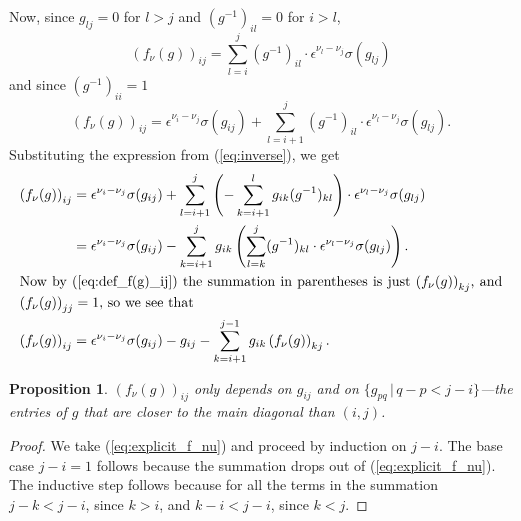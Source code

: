 \documentclass{amsart}
\newtheorem{prop}{Proposition}[subsection]
\theoremstyle{definition}
\def\e{\epsilon}
\def\s{\sigma}
\def\f{f_\nu}
\begin{document}
  Now, since $g_{lj} = 0$ for $l > j$ and $(g^{-1})_{il} = 0$ for $i > l$,
  \begin{equation}
    \label{eq:def_f(g)_ij}
    \left(\f(g)\right)_{ij} = \sum_{l=i}^j (g^{-1})_{il} \cdot \e^{\nu_l-\nu_j}\s(g_{lj})
  \end{equation}
  and since $(g^{-1})_{ii} = 1$
  \begin{equation*}
    \left(\f(g)\right)_{ij} = \e^{\nu_i-\nu_j}\s(g_{ij}) + \sum_{l=i+1}^j (g^{-1})_{il} \cdot \e^{\nu_l-\nu_j}\s(g_{lj}).
  \end{equation*}
  Substituting the expression from (\ref{eq:inverse}), we get
  \begin{align}
    \label{eq:explicit_f_nu}
    \left(\f(g)\right)_{ij} &= \e^{\nu_i-\nu_j}\s(g_{ij}) +
    \sum_{l=i+1}^j  \left(- \sum_{k=i+1}^l g_{ik}(g^{-1})_{kl} \right) \cdot \e^{\nu_l-\nu_j}\s(g_{lj}) \nonumber \\
    &= \e^{\nu_i-\nu_j}\s(g_{ij}) - 
    \sum_{k=i+1}^j g_{ik} \left(\sum_{l=k}^j (g^{-1})_{kl} \cdot
    \e^{\nu_l-\nu_j}\s(g_{lj})\right). \nonumber \\
    \noalign{\noindent Now by (\ref{eq:def_f(g)_ij}) the summation in
    parentheses is just $\left(\f(g)\right)_{kj}$, and $\left(\f(g)\right)_{jj}
    = 1$, so we see that}
    \left(\f(g)\right)_{ij} &= \e^{\nu_i-\nu_j}\s(g_{ij}) - g_{ij} -
    \sum_{k=i+1}^{j-1} g_{ik} \left(\f(g)\right)_{kj}.
  \end{align}

  \begin{prop}
    \label{prop:f_nu_dependence}
    $\left(\f(g)\right)_{ij}$ only depends on $g_{ij}$ and on $\{ g_{pq} \,|\,
    q-p < j - i \}$---the entries of $g$ that are closer to the main diagonal
    than $(i,j)$.
  \end{prop}
  \begin{proof}
    We take (\ref{eq:explicit_f_nu}) and proceed by induction on $j-i$.  The
    base case $j-i = 1$ follows because the summation drops out of
    (\ref{eq:explicit_f_nu}).  The inductive step follows because for
    all the terms in the summation $j - k < j - i$, since $k > i$, and $k - i <
    j - i$, since $k < j$.
  \end{proof}
\end{document}
